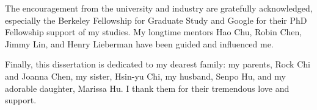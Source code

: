 \begin{acknowledgements}
The encouragement from the university and industry are gratefully acknowledged, especially the Berkeley Fellowship for Graduate Study and Google for their PhD Fellowship support of my studies. My longtime mentors Hao Chu, Robin Chen, Jimmy Lin, and Henry Lieberman have been guided and influenced me.

Finally, this dissertation is dedicated to my dearest family: my parents, Rock Chi and Joanna Chen, my sister, Hsin-yu Chi, my husband, Senpo Hu, and my adorable daughter, Marissa Hu. I thank them for their tremendous love and support.

\end{acknowledgements}
